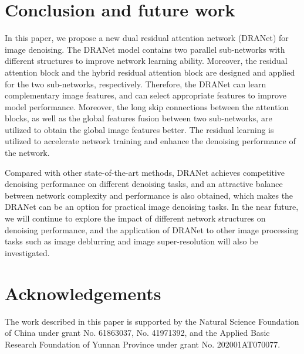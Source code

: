 \documentclass[3p,times]{elsarticle}
\begin{document}
\section{Conclusion and future work}\label{Conclusion}
In this paper, we propose a new dual residual attention network (DRANet) for image denoising. The DRANet model contains two parallel sub-networks with different structures to improve network learning ability. Moreover, the residual attention block and the hybrid residual attention block are designed and applied for the two sub-networks, respectively. Therefore, the DRANet can learn complementary image features, and can select appropriate features to improve model performance. Moreover, the long skip connections between the attention blocks, as well as the global features fusion between two sub-networks, are utilized to obtain the global image features better. The residual learning is utilized to accelerate network training and enhance the denoising performance of the network.

Compared with other state-of-the-art methods, DRANet achieves competitive denoising performance on different denoising tasks, and an attractive balance between network complexity and performance is also obtained, which makes the DRANet can be an option for practical image denoising tasks. In the near future, we will continue to explore the impact of different network structures on denoising performance, and the application of DRANet to other image processing tasks such as image deblurring and image super-resolution will also be investigated.

\section{Acknowledgements}
The work described in this paper is supported by the Natural Science Foundation of China under grant No. 61863037, No. 41971392, and the Applied Basic Research Foundation of Yunnan Province under grant No. 202001AT070077.

\end{document}
